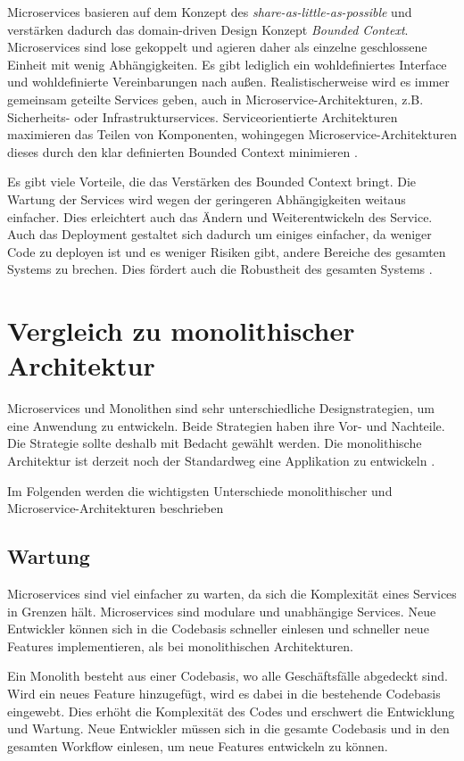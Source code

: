 Microservices basieren auf dem Konzept des \textit{share-as-little-as-possible} und verstärken dadurch das domain-driven Design Konzept \textit{Bounded Context}. Microservices sind lose gekoppelt und agieren daher als einzelne geschlossene Einheit mit wenig Abhängigkeiten. Es gibt lediglich ein wohldefiniertes Interface und wohldefinierte Vereinbarungen nach außen. 
Realistischerweise wird es immer gemeinsam geteilte Services geben, auch in Microservice-Architekturen, z.B. Sicherheits- oder Infrastrukturservices. Serviceorientierte Architekturen maximieren das Teilen von Komponenten, wohingegen Microservice-Architekturen dieses durch den klar definierten Bounded Context minimieren \cite[Kapitel 3]{MicroservicesVSSOA}.

Es gibt viele Vorteile, die das Verstärken des Bounded Context bringt. Die Wartung der Services wird wegen der geringeren Abhängigkeiten weitaus einfacher. Dies erleichtert auch das Ändern und Weiterentwickeln des Service. Auch das Deployment gestaltet sich dadurch um einiges einfacher, da weniger Code zu deployen ist und es weniger Risiken gibt, andere Bereiche des gesamten Systems zu brechen. Dies fördert auch die Robustheit des gesamten Systems \cite[Kapitel 4]{MicroservicesVSSOA}.


\section{Vergleich zu monolithischer Architektur}
Microservices und Monolithen sind sehr unterschiedliche Designstrategien, um eine Anwendung zu entwickeln. Beide Strategien haben ihre Vor- und Nachteile. Die Strategie sollte deshalb mit Bedacht gewählt werden. Die monolithische Architektur ist derzeit noch der Standardweg eine Applikation zu entwickeln \cite{FowlerDSM}.

Im Folgenden werden die wichtigsten Unterschiede monolithischer und Microservice-Architekturen beschrieben \cite[Kapitel 3]{MonolithVSMicroservices}

\subsection{Wartung}
Microservices sind viel einfacher zu warten, da sich die Komplexität eines Services in Grenzen hält. Microservices sind modulare und unabhängige Services. Neue Entwickler können sich in die Codebasis schneller einlesen und schneller neue Features implementieren, als bei monolithischen Architekturen.

Ein Monolith besteht aus einer Codebasis, wo alle Geschäftsfälle abgedeckt sind. Wird ein neues Feature hinzugefügt, wird es dabei in die bestehende Codebasis eingewebt. 
Dies erhöht die Komplexität des Codes und erschwert die Entwicklung und Wartung.
Neue Entwickler müssen sich in die gesamte Codebasis und in den gesamten Workflow einlesen, um neue Features entwickeln zu können.


